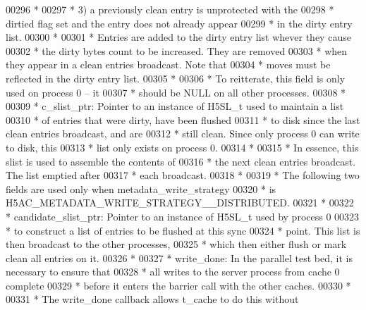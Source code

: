 \begin{DoxyCode}
00296 \textcolor{comment}{ *}
00297 \textcolor{comment}{ *      3) a previously clean entry is unprotected with the}
00298 \textcolor{comment}{ *         dirtied flag set and the entry does not already appear}
00299 \textcolor{comment}{ *         in the dirty entry list.}
00300 \textcolor{comment}{ *}
00301 \textcolor{comment}{ *      Entries are added to the dirty entry list whever they cause}
00302 \textcolor{comment}{ *      the dirty bytes count to be increased.  They are removed}
00303 \textcolor{comment}{ *      when they appear in a clean entries broadcast.  Note that}
00304 \textcolor{comment}{ *      moves must be reflected in the dirty entry list.}
00305 \textcolor{comment}{ *}
00306 \textcolor{comment}{ *      To reitterate, this field is only used on process 0 -- it}
00307 \textcolor{comment}{ *      should be NULL on all other processes.}
00308 \textcolor{comment}{ *}
00309 \textcolor{comment}{ * c\_slist\_ptr: Pointer to an instance of H5SL\_t used to maintain a list}
00310 \textcolor{comment}{ *      of entries that were dirty, have been flushed}
00311 \textcolor{comment}{ *      to disk since the last clean entries broadcast, and are}
00312 \textcolor{comment}{ *      still clean.  Since only process 0 can write to disk, this}
00313 \textcolor{comment}{ *      list only exists on process 0.}
00314 \textcolor{comment}{ *}
00315 \textcolor{comment}{ *      In essence, this slist is used to assemble the contents of}
00316 \textcolor{comment}{ *      the next clean entries broadcast.  The list emptied after}
00317 \textcolor{comment}{ *      each broadcast.}
00318 \textcolor{comment}{ *}
00319 \textcolor{comment}{ * The following two fields are used only when metadata\_write\_strategy}
00320 \textcolor{comment}{ * is H5AC\_METADATA\_WRITE\_STRATEGY\_\_DISTRIBUTED.}
00321 \textcolor{comment}{ *}
00322 \textcolor{comment}{ * candidate\_slist\_ptr: Pointer to an instance of H5SL\_t used by process 0}
00323 \textcolor{comment}{ *      to construct a list of entries to be flushed at this sync}
00324 \textcolor{comment}{ *      point.  This list is then broadcast to the other processes,}
00325 \textcolor{comment}{ *      which then either flush or mark clean all entries on it.}
00326 \textcolor{comment}{ *}
00327 \textcolor{comment}{ * write\_done:  In the parallel test bed, it is necessary to ensure that}
00328 \textcolor{comment}{ *              all writes to the server process from cache 0 complete}
00329 \textcolor{comment}{ *              before it enters the barrier call with the other caches.}
00330 \textcolor{comment}{ *}
00331 \textcolor{comment}{ *              The write\_done callback allows t\_cache to do this without}

\end{DoxyCode}
